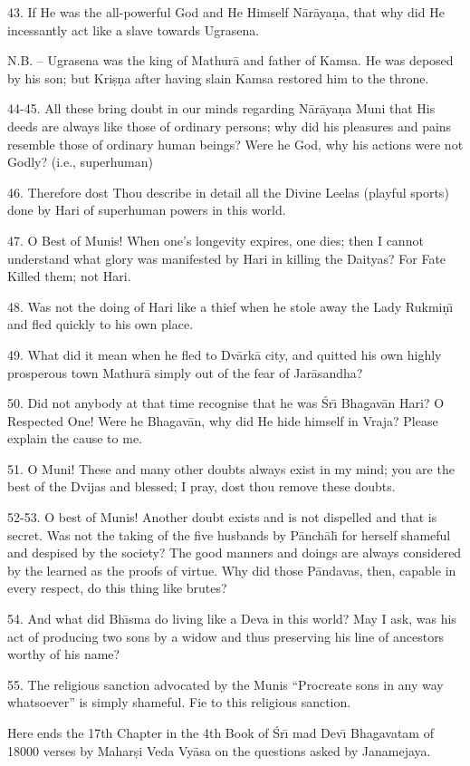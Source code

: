 43. If He was the all-powerful God and He Himself N\=ar\=aya\d{n}a, that why did He incessantly act like a slave towards Ugrasena.

N.B. -- Ugrasena was the king of Mathur\=a and father of Kamsa. He was deposed by his son; but Kri\d{s}\d{n}a after having slain Kamsa restored him to the throne.

44-45. All these bring doubt in our minds regarding N\=ar\=aya\d{n}a Muni that His deeds are always like those of ordinary persons; why did his pleasures and pains resemble those of ordinary human beings? Were he God, why his actions were not Godly? (i.e., superhuman)

46. Therefore dost Thou describe in detail all the Divine Leelas (playful sports) done by Hari of superhuman powers in this world.

47. O Best of Munis! When one's longevity expires, one dies; then I cannot understand what glory was manifested by Hari in killing the Daityas? For Fate Killed them; not Hari.

48. Was not the doing of Hari like a thief when he stole away the Lady Rukmi\d{n}\={\i} and fled quickly to his own place.

49. What did it mean when he fled to Dv\=ark\=a city, and quitted his own highly prosperous town Mathur\=a simply out of the fear of Jar\=asandha?

50. Did not anybody at that time recognise that he was \'Sr\={\i} Bhagav\=an Hari? O Respected One! Were he Bhagav\=an, why did He hide himself in Vraja? Please explain the cause to me.

51. O Muni! These and many other doubts always exist in my mind; you are the best of the Dvijas and blessed; I pray, dost thou remove these doubts.

52-53. O best of Munis! Another doubt exists and is not dispelled and that is secret. Was not the taking of the five husbands by P\=anch\=al\={\i} for herself shameful and despised by the society? The good manners and doings are always considered by the learned as the proofs of virtue. Why did those P\=andavas, then, capable in every respect, do this thing like brutes?

54. And what did Bh\={\i}sma do living like a Deva in this world? May I ask, was his act of producing two sons by a widow and thus preserving his line of ancestors worthy of his name?

55. The religious sanction advocated by the Munis ``Procreate sons in any way whatsoever'' is simply shameful. Fie to this religious sanction.

Here ends the 17th Chapter in the 4th Book of \'Sr\={\i} mad Dev\={\i} Bhagavatam of 18000 verses by Mahar\d{s}i Veda Vy\=asa on the questions asked by Janamejaya.



